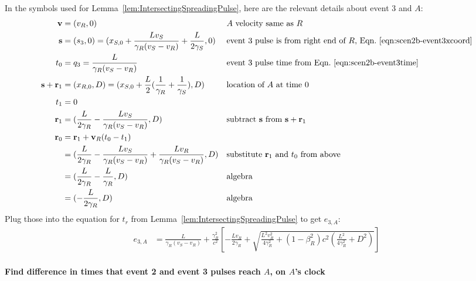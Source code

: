 \documentclass[a4paper]{article}
\theoremstyle{plain}
\theoremstyle{definition}
\newcommand{\vect}[1]{\mathbf{#1}}
\begin{document}
In the symbols used for Lemma~\ref{lem:IntersectingSpreadingPulse},
here are the relevant details about event 3 and $A$:
\begin{align*}
\vect{v} & = (v_R, 0) & & \text{$A$ velocity same as $R$} \\
\vect{s} & = (s_3,0) = (x_{S,0} + \frac{Lv_S}{\gamma_R(v_S - v_R)} + \frac{L}{2\gamma_S}, 0) & & \text{event 3 pulse is from right end of $R$, Eqn.~\eqref{eqn:scen2b-event3xcoord}} \\
t_0 & = q_3 = \frac{L}{\gamma_R(v_S - v_R)} & & \text{event 3 pulse time from Eqn.~\eqref{eqn:scen2b-event3time}} \\
\vect{s} + \vect{r}_1 & = (x_{R,0}, D) = (x_{S,0} + \frac{L}{2} ( \frac{1}{\gamma_R} + \frac{1}{\gamma_S} ), D) & & \text{location of $A$ at time 0} \\
t_1 & = 0 \\
\vect{r}_1 & = (\frac{L}{2\gamma_R} - \frac{Lv_S}{\gamma_R(v_S - v_R)}, D) & & \text{subtract $\vect{s}$ from $\vect{s}+\vect{r}_1$} \\
\vect{r}_0
  & = \vect{r}_1 + \vect{v}_R(t_0-t_1) \\
  & = (\frac{L}{2\gamma_R} - \frac{Lv_S}{\gamma_R(v_S - v_R)} + \frac{Lv_R}{\gamma_R(v_S - v_R)}, D) & & \text{substitute $\vect{r}_1$ and $t_0$ from above} \\
  & = (\frac{L}{2\gamma_R} - \frac{L}{\gamma_R}, D) & & \text{algebra} \\
  & = (-\frac{L}{2\gamma_R}, D) & & \text{algebra}
\end{align*}
Plug those into the equation for $t_r$ from
Lemma~\ref{lem:IntersectingSpreadingPulse} to get $e_{3,A}$:
\begin{align*}
e_{3,A} & = \frac{L}{\gamma_R(v_S - v_R)} + \frac{\gamma_R^2}{c^2} \left[ -\frac{Lv_R}{2\gamma_R} + \sqrt{\frac{L^2v_R^2}{4\gamma_R^2} + (1-\beta_R^2)c^2 (\frac{L^2}{4\gamma_R^2} + D^2)} \right]
\end{align*}


\paragraph{Find difference in times that event 2 and event 3 pulses reach $A$, on $A$'s clock}
\end{document}
